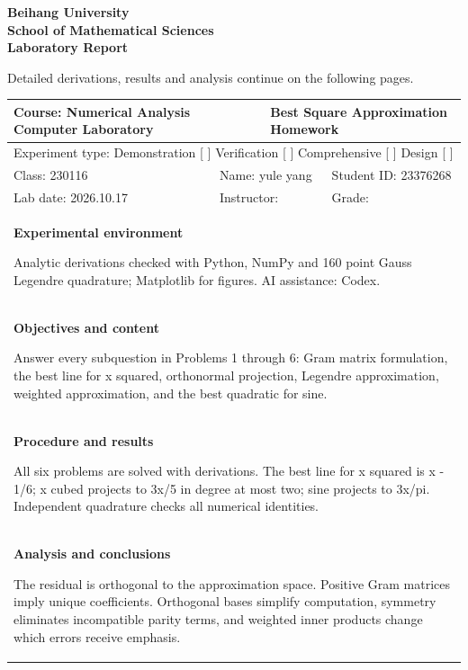 \documentclass[a4paper,11pt]{article}
\begin{document}
\thispagestyle{empty}
\begin{center}{\Large\bfseries Beihang University\\School of Mathematical Sciences\\Laboratory Report}\end{center}
{\small Detailed derivations, results and analysis continue on the following pages.}\par
\vspace{3mm}
\begin{tabular}{|p{.22\linewidth}|p{.22\linewidth}|p{.22\linewidth}|p{.22\linewidth}|}\hline
\multicolumn{2}{|p{.47\linewidth}|}{Course: Numerical Analysis Computer Laboratory} & \multicolumn{2}{p{.43\linewidth}|}{Best Square Approximation Homework}\\\hline
\multicolumn{4}{|l|}{Experiment type: Demonstration [ ] Verification [ ] Comprehensive [ ] Design [ ]}\\\hline
Class: 230116 & \multicolumn{2}{l|}{Name: yule yang} & Student ID: 23376268\\\hline
Lab date: 2026.10.17 & \multicolumn{2}{l|}{Instructor:} & Grade:\\\hline

\multicolumn{4}{|p{.95\linewidth}|}{\textbf{Experimental environment}\par Analytic derivations checked with Python, NumPy and 160 point Gauss Legendre quadrature; Matplotlib for figures. AI assistance: Codex.\par\vspace{4mm}}\\\hline
\multicolumn{4}{|p{.95\linewidth}|}{\textbf{Objectives and content}\par Answer every subquestion in Problems 1 through 6: Gram matrix formulation, the best line for x squared, orthonormal projection, Legendre approximation, weighted approximation, and the best quadratic for sine.\par\vspace{4mm}}\\\hline
\multicolumn{4}{|p{.95\linewidth}|}{\textbf{Procedure and results}\par All six problems are solved with derivations. The best line for x squared is x - 1/6; x cubed projects to 3x/5 in degree at most two; sine projects to 3x/pi. Independent quadrature checks all numerical identities.\par\vspace{4mm}}\\\hline
\multicolumn{4}{|p{.95\linewidth}|}{\textbf{Analysis and conclusions}\par The residual is orthogonal to the approximation space. Positive Gram matrices imply unique coefficients. Orthogonal bases simplify computation, symmetry eliminates incompatible parity terms, and weighted inner products change which errors receive emphasis.\par\vspace{4mm}}\\\hline
\end{tabular}
\clearpage
\end{document}
